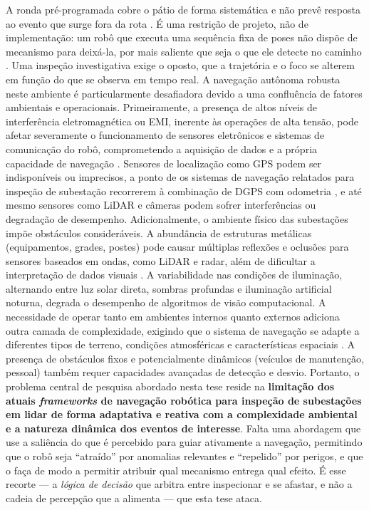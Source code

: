 A ronda pré-programada cobre o pátio de forma sistemática e não prevê resposta ao evento que surge fora da rota \cite{TJH2b2023Trends}. É uma restrição de projeto, não de implementação: um robô que executa uma sequência fixa de poses não dispõe de mecanismo para deixá-la, por mais saliente que seja o que ele detecte no caminho \cite{Wei2024Advancements}. Uma inspeção investigativa exige o oposto, que a trajetória e o foco se alterem em função do que se observa em tempo real.
A navegação autônoma robusta neste ambiente é particularmente desafiadora devido a uma confluência de fatores ambientais e operacionais. Primeiramente, a presença de altos níveis de interferência eletromagnética ou \ac{EMI}, inerente às operações de alta tensão, pode afetar severamente o funcionamento de sensores eletrônicos e sistemas de comunicação do robô, comprometendo a aquisição de dados e a própria capacidade de navegação \cite{He2007EMCSubstation,tdworld2024Challenges}. Sensores de localização como GPS podem ser indisponíveis ou imprecisos, a ponto de os sistemas de navegação relatados para inspeção de subestação recorrerem à combinação de DGPS com odometria \cite{Yan2024CombinedNav}, e até mesmo sensores como \ac{LiDAR} e câmeras podem sofrer interferências ou degradação de desempenho.
Adicionalmente, o ambiente físico das subestações impõe obstáculos consideráveis. A abundância de estruturas metálicas (equipamentos, grades, postes) pode causar múltiplas reflexões e oclusões para sensores baseados em ondas, como \ac{LiDAR} e radar, além de dificultar a interpretação de dados visuais \cite{Wijayathunga2023Challenges, Cai2025AttentionSeg}. A variabilidade nas condições de iluminação, alternando entre luz solar direta, sombras profundas e iluminação artificial noturna, degrada o desempenho de algoritmos de visão computacional. A necessidade de operar tanto em ambientes internos quanto externos adiciona outra camada de complexidade, exigindo que o sistema de navegação se adapte a diferentes tipos de terreno, condições atmosféricas e características espaciais \cite{Alatise2020Review}. A presença de obstáculos fixos e potencialmente dinâmicos (veículos de manutenção, pessoal) também requer capacidades avançadas de detecção e desvio.
Portanto, o problema central de pesquisa abordado nesta tese reside na \textbf{limitação dos atuais \textit{frameworks} de navegação robótica para inspeção de subestações em lidar de forma adaptativa e reativa com a complexidade ambiental e a natureza dinâmica dos eventos de interesse}. Falta uma abordagem que use a saliência do que é percebido para guiar ativamente a navegação, permitindo que o robô seja ``atraído'' por anomalias relevantes e ``repelido'' por perigos, e que o faça de modo a permitir atribuir qual mecanismo entrega qual efeito. É esse recorte --- a \emph{lógica de decisão} que arbitra entre inspecionar e se afastar, e não a cadeia de percepção que a alimenta --- que esta tese ataca.

